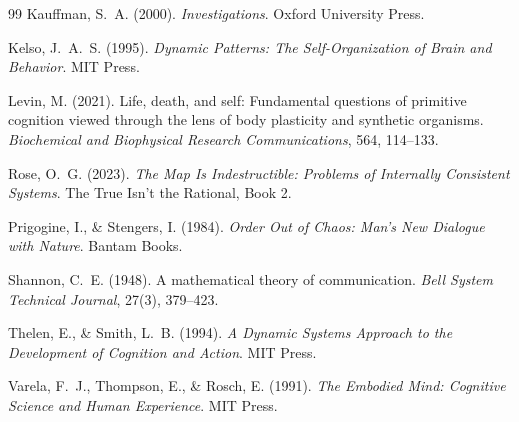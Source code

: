 \documentclass[11pt]{article}
\begin{document}
\begin{thebibliography}{99}
Kauffman, S.~A. (2000).
\textit{Investigations}.
Oxford University Press.

Kelso, J.~A.~S. (1995).
\textit{Dynamic Patterns: The Self-Organization of Brain and Behavior}.
MIT Press.

Levin, M. (2021).
Life, death, and self: Fundamental questions of primitive cognition viewed through the
lens of body plasticity and synthetic organisms.
\textit{Biochemical and Biophysical Research Communications}, 564, 114--133.

Rose, O.~G. (2023).
\textit{The Map Is Indestructible: Problems of Internally Consistent Systems}.
The True Isn't the Rational, Book 2.

Prigogine, I., \& Stengers, I. (1984).
\textit{Order Out of Chaos: Man's New Dialogue with Nature}.
Bantam Books.

Shannon, C.~E. (1948).
A mathematical theory of communication.
\textit{Bell System Technical Journal}, 27(3), 379--423.

Thelen, E., \& Smith, L.~B. (1994).
\textit{A Dynamic Systems Approach to the Development of Cognition and Action}.
MIT Press.

Varela, F.~J., Thompson, E., \& Rosch, E. (1991).
\textit{The Embodied Mind: Cognitive Science and Human Experience}.
MIT Press.

\end{thebibliography}
\end{document}
